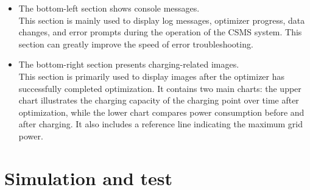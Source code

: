 \documentclass[
english,
ruledheaders=section,%
class=report,%
thesis={type=Report},%
accentcolor=9c,%
custommargins=true,%
marginpar=false,%
parskip=half-,%
fontsize=11pt,%
logofile={img/tuda_logo.pdf}, %
]{tudapub}
\begin{document}
\begin{itemize}
            \item The bottom-left section shows console messages.\\
            This section is mainly used to display log messages, optimizer progress, data changes, and error prompts during the operation of the CSMS system. This section can greatly improve the speed of error troubleshooting.

            \item The bottom-right section presents charging-related images. \\
            This section is primarily used to display images after the optimizer has successfully completed optimization. It contains two main charts: the upper chart illustrates the charging capacity of the charging point over time after optimization, while the lower chart compares power consumption before and after charging. It also includes a reference line indicating the maximum grid power.

        \end{itemize}


        \chapter{Simulation and test}
        \label{SimulationAndTest}
\end{document}
